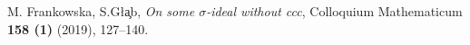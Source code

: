 \documentclass[12pt]{amsart}
\theoremstyle{plain}
\theoremstyle{definition}
\theoremstyle{remark}
\begin{document}
\begin{thebibliography}{10}

M. Frankowska, S.G\l{}\c{a}b, 
\emph{On some $\sigma$-ideal without ccc}, Colloquium Mathematicum \textbf{158 (1)} (2019), 127--140.
\end{thebibliography}
\end{document}
